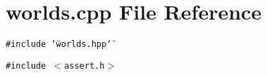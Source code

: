 \section{worlds.cpp File Reference}
\label{worlds_8cpp}
{\tt \#include \char`\"{}worlds.hpp\char`\"{}}\par
{\tt \#include $<$assert.h$>$}\par
